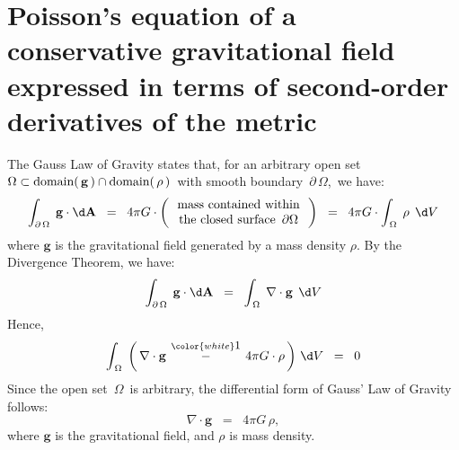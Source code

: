 

\section{Poisson's equation of a conservative gravitational field expressed in terms of second-order derivatives of the metric}
\setcounter{theorem}{0}
\setcounter{equation}{0}


\renewcommand{\theenumi}{\roman{enumi}}
\renewcommand{\labelenumi}{\textnormal{(\theenumi)}$\;\;$}


The Gauss Law of Gravity states that,
for an arbitrary open set
\,$\Omega \subset \textnormal{domain}(\,\mathbf{g}\,) \cap \textnormal{domain}(\,\rho\,)$\,
with smooth boundary \,$\partial\,\Omega$,\,
we have:
\begin{equation*}
\int_{\partial\,\Omega}\;\mathbf{g} \cdot \d\mathbf{A}
\;\; = \;\;
	4 \pi G \cdot
	\left(\,
		\begin{array}{c}
		\textnormal{mass contained within}
		\\
		\textnormal{the closed surface \,$\partial\Omega$}
		\end{array}
		\,\right)
\;\; = \;\;
	4 \pi G \cdot
	\int_{\,\Omega}\; \rho \,\;\d V
\end{equation*}
where $\mathbf{g}$ is the gravitational field generated by a mass density  $\rho$.
By the Divergence Theorem, we have:
\begin{equation*}
\int_{\partial\,\Omega}\;\mathbf{g} \cdot \d\mathbf{A}
\;\; = \;\;
	\int_{\,\Omega}\; \nabla \cdot \mathbf{g} \,\;\d V
\end{equation*}
Hence,
\begin{equation*}
\int_{\,\Omega}\;
	\left(\,
		\nabla \cdot \mathbf{g}
		\, \overset{{\color{white}\textnormal{\small1}}}{-} \,
		4 \pi G \cdot \rho
		\,\right)
	\,\d V
\;\; = \;\;
	0
\end{equation*}
Since the open set \,$\Omega$\, is arbitrary, the differential form of Gauss' Law of Gravity follows:
\begin{equation*}
\nabla \cdot \mathbf{g} \;\; = \;\; 4 \pi G \, \rho,
\end{equation*}
where $\mathbf{g}$ is the gravitational field, and $\rho$ is mass density.

